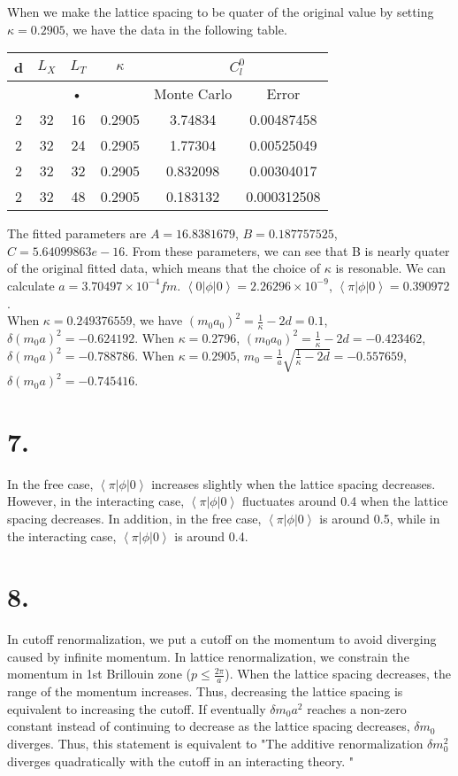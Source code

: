 \documentclass[12pt]{article}
\begin{document}
When we make the lattice spacing to be quater of the original value by setting $\kappa = 0.2905$, we have the data in the following table. \\
\begin{center}
\begin{tabular}{|c|c|c|c|c|c|}
\hline 
d & $L_X$ & $L_T$ & $\kappa$ & \multicolumn{2}{c|}{$C_l^0$} \\ 
\hline 
\multicolumn{4}{|c|}{•} & Monte Carlo & Error\\ 
\hline 
2 & 32 & 16 & 0.2905 & 3.74834 & 0.00487458\\ 
\hline 
2 & 32 & 24 & 0.2905 & 1.77304 & 0.00525049\\ 
\hline 
2 & 32 & 32 & 0.2905 & 0.832098 & 0.00304017\\ 
\hline 
2 & 32 & 48 & 0.2905 & 0.183132 & 0.000312508\\ 
\hline 
\end{tabular} 
\end{center}
The fitted parameters are $A = 16.8381679$, $B = 0.187757525$, $C = 5.64099863e-16$. From these parameters, we can see that B is nearly quater of the original fitted data, which means that the choice of $\kappa$ is resonable. We can calculate $a = 3.70497\times10^{-4} fm$. $\left<0|\phi|0\right> = 2.26296\times10^{-9}$, $\left<\pi|\phi|0\right> = 0.390972$. \\
When $\kappa = 0.249376559$, we have $(m_0a_0)^2 = \frac{1}{\kappa}-2d = 0.1$, $\delta (m_0a)^2 = -0.624192$. When $\kappa = 0.2796$,  $(m_0a_0)^2 = \frac{1}{\kappa}-2d = -0.423462$, $\delta (m_0a)^2 = -0.788786$. When $\kappa = 0.2905$,  $m_0 = \frac{1}{a}\sqrt{\frac{1}{\kappa}-2d} = -0.557659$, $\delta (m_0a)^2 = -0.745416$. 

\section*{7.}
In the free case, $\left<\pi|\phi|0\right>$ increases slightly when the lattice spacing decreases. However, in the interacting case, $\left<\pi|\phi|0\right>$ fluctuates around 0.4 when the lattice spacing decreases. In addition, in the free case, $\left<\pi|\phi|0\right>$ is around 0.5, while in the interacting case, $\left<\pi|\phi|0\right>$ is around 0.4. \\

\section*{8.}
In cutoff renormalization, we put a cutoff on the momentum to avoid diverging caused by infinite momentum. In lattice renormalization, we constrain the momentum in 1st Brillouin zone ($p \leq \frac{2\pi}{a}$). When the lattice spacing decreases, the range of the momentum increases. Thus, decreasing the lattice spacing is equivalent to increasing the cutoff. If eventually $\delta m_0 a^2$ reaches a non-zero constant instead of continuing to decrease as the lattice spacing decreases, $\delta m_0$ diverges. Thus, this statement is equivalent to "The additive renormalization $\delta m_0^2$ diverges quadratically with the cutoff in an interacting theory. "
\end{document}
